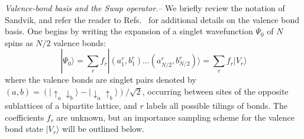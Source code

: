 \documentclass[prl,aps,twocolumn,floatfix,amsmath,amssymb,superscriptaddress,tightenlines]{revtex4}
\begin{document}
{\it Valence-bond basis and the Swap operator.}-- We briefly review the notation of Sandvik, and refer the reader to 
Refs.~\cite{Sandvik,Beach,AWSloop} for additional details on the valence bond basis.
One begins by writing the expansion of a singlet
wavefunction $\Psi_0$ of $N$ spins as $N/2$ valence bonds:
\begin{equation}
| \Psi_0 \rangle = \sum_r f_r|(a^r_1,b^r_1) \ldots (a^r_{N/2},b^r_{N/2}) \rangle = \sum_r f_r| V_r \rangle
\end{equation}
where the valence bonds are singlet pairs denoted by $(a,b) = (\lvert\uparrow_a \downarrow_b \rangle - \lvert\downarrow_a \uparrow_b\rangle)/\sqrt{2}$,
occurring between sites of the opposite sublattices of a bipartite lattice, and $r$ labels all possible tilings of bonds.  The coefficients $f_r$ are unknown, but an importance sampling scheme \cite{Sandvik} for the valence bond state $| V_r \rangle$ will be outlined below.  
\end{document}
